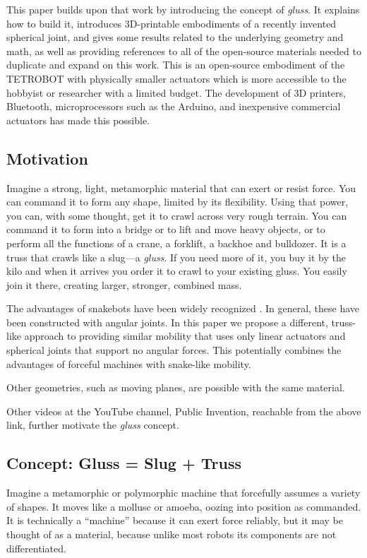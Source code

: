 \documentclass[11pt]{article}
\begin{document}
This paper builds upon that work by introducing the concept of \emph{gluss}. It explains how to build it,
introduces 3D-printable embodiments of
a recently invented spherical joint, 
and gives some results related to the underlying geometry and math, as well as providing
references to all of the open-source materials needed to duplicate and expand on this work. This is an
open-source embodiment of the TETROBOT with physically smaller actuators which is more accessible to the
hobbyist or researcher with a limited budget.  The development of 3D printers, Bluetooth, microprocessors
such as the Arduino, and inexpensive commercial actuators has made this possible.

\subsection{Motivation}

Imagine a strong, light, metamorphic material that can exert or resist force.
You can command it to form any shape, limited by its flexibility.
Using that power, you can, with some thought, get it to crawl across very rough terrain.
You can command it to form into a bridge or to lift and move heavy objects,
or to perform all the functions of a crane, a forklift, a backhoe and bulldozer.
It is a truss that crawls like a slug---a \emph{gluss}.
If you need more of it, you buy it by the kilo and when it arrives you order it
to crawl to your existing gluss. You easily join it there, creating 
larger, stronger, combined mass.

The advantages of snakebots have been widely recognized \cite{liljebäck2012snake}. In general, these have been constructed
with angular joints. In this paper we propose a different, truss-like approach to providing similar
mobility that uses only linear actuators and spherical joints that support no angular forces. This
potentially combines the advantages of forceful machines with snake-like mobility.

Other geometries, such as moving planes, are possible with the same material.

Other videos at the YouTube channel, Public Invention, reachable from the above link,
further motivate the \emph{gluss} concept.


\subsection{Concept: Gluss = Slug + Truss}

Imagine a metamorphic or polymorphic machine that forcefully assumes a variety of shapes. It moves like a mollusc or amoeba,
oozing into position as commanded. It is technically a ``machine'' because it can exert force reliably, but
it may be thought of as a material, because unlike most robots its components are not differentiated.
\end{document}
